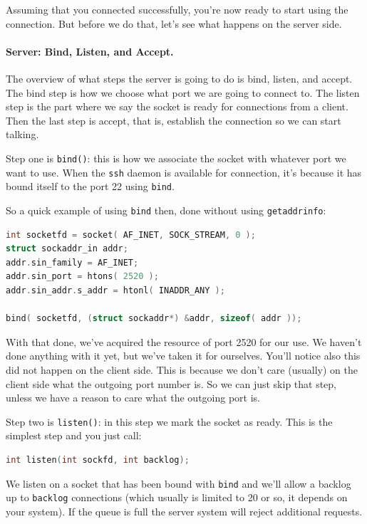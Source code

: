 Assuming that you connected successfully, you're now ready to start using the connection. But before we do that, let's see what happens on the server side.

\paragraph{Server: Bind, Listen, and Accept.}
The overview of what steps the server is going to do is bind, listen, and accept. The bind step is how we choose what port we are going to connect to. The listen step is the part where we say the socket is ready for connections from a client. Then the last step is accept, that is, establish the connection so we can start talking.

Step one is \texttt{bind()}: this is how we associate the socket with whatever port we want to use. When the \texttt{ssh} daemon is available for connection, it's because it has bound itself to the port 22 using \texttt{bind}.

So a quick example of using \texttt{bind} then, done without using \texttt{getaddrinfo}:

\begin{lstlisting}[language=C]
int socketfd = socket( AF_INET, SOCK_STREAM, 0 );
struct sockaddr_in addr;
addr.sin_family = AF_INET;
addr.sin_port = htons( 2520 );
addr.sin_addr.s_addr = htonl( INADDR_ANY );

bind( socketfd, (struct sockaddr*) &addr, sizeof( addr ));
\end{lstlisting}

With that done, we've acquired the resource of port 2520 for our use. We haven't done anything with it yet, but we've taken it for ourselves. You'll notice also this did not happen on the client side. This is because we don't care (usually) on the client side what the outgoing port number is. So we can just skip that step, unless we have a reason to care what the outgoing port is.

Step two is \texttt{listen()}: in this step we mark the socket as ready. This is the simplest step and you just call:

\begin{lstlisting}[language=C]
int listen(int sockfd, int backlog); 
\end{lstlisting}

We listen on a socket that has been bound with \texttt{bind} and we'll allow a backlog up to \texttt{backlog} connections (which usually is limited to 20 or so, it depends on your system). If the queue is full the server system will reject additional requests.

